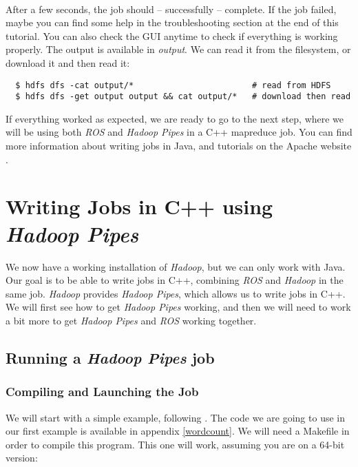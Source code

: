 \documentclass[a4paper, 12pt]{article}
\begin{document}
~\\
After a few seconds, the job should -- successfully -- complete. If the job failed, maybe you can find some help in the troubleshooting section at the end of this tutorial. You can also check the GUI anytime to check if everything is working properly. The output is available in \textit{output}. We can read it from the filesystem, or download it and then read it:

\begin{verbatim}
  $ hdfs dfs -cat output/*                        # read from HDFS
  $ hdfs dfs -get output output && cat output/*   # download then read
\end{verbatim}

If everything worked as expected, we are ready to go to the next step, where we will be using both \textit{ROS} and \textit{Hadoop Pipes} in a C++ mapreduce job. You can find more information about writing jobs in Java, and tutorials on the Apache website \cite{hadoop_mapreduce_tutorial}.

\section{Writing Jobs in C++ using \textit{Hadoop Pipes}}

We now have a working installation of \textit{Hadoop}, but we can only work with Java. Our goal is to be able to write jobs in C++, combining \textit{ROS} and \textit{Hadoop} in the same job. \textit{Hadoop} provides \textit{Hadoop Pipes}, which allows us to write jobs in C++. We will first see how to get \textit{Hadoop Pipes} working, and then we will need to work a bit more to get \textit{Hadoop Pipes} and \textit{ROS} working together.

  \subsection{Running a \textit{Hadoop Pipes} job}
  
    \subsubsection{Compiling and Launching the Job}

We will start with a simple example, following \cite{smith_pipes}. The code we are going to use in our first example is available in appendix \ref{wordcount}. We will need a Makefile in order to compile this program. This one will work, assuming you are on a 64-bit version:
\end{document}
